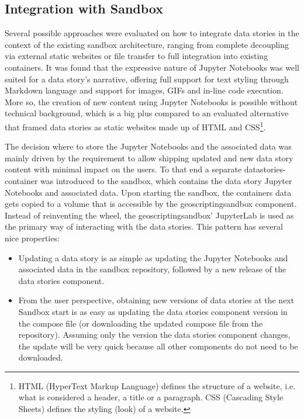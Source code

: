 \documentclass[11pt, a4paper, oneside, parskip=full-]{scrartcl}
\begin{document}
\subsection{Integration with Sandbox}
Several possible approaches were evaluated on how to integrate data stories in
the context of the existing sandbox architecture, ranging from complete
decoupling via external static websites or file transfer to full integration
into existing containers. It was found that the expressive nature of Jupyter
Notebooks was well suited for a data story's narrative, offering full support
for text styling through Markdown language and support for images, GIFs and
in-line code execution. More so, the creation of new content using Jupyter
Notebooks is possible without technical background, which is a big plus compared
to an evaluated alternative that framed data stories as static websites made up
of HTML and CSS\footnote{HTML (HyperText Markup Language) defines the structure
of a website, i.e. what is considered a header, a title or a paragraph. CSS
(Cascading Style Sheets) defines the styling (look) of a website.}.

The decision where to store the Jupyter Notebooks and the associated data was
mainly driven by the requirement to allow shipping updated and new data story
content with minimal impact on the users. To that end a separate
datastories-container was introduced to the sandbox, which contains the data
story Jupyter Notebooks and associated data. Upon starting the sandbox, the
containers data gets copied to a volume that is accessible by the
geoscriptingsandbox component. Instead of reinventing the wheel, the
geoscriptingsandbox' JupyterLab is used as the primary way of interacting with
the data stories. This pattern has several nice properties:
\begin{itemize}
  \item Updating a data story is as simple as updating the Jupyter Notebooks and
  associated data in the sandbox repository, followed by a new release of the
  data stories component.
  \item From the user perspective, obtaining new versions of data stories at the
  next Sandbox start is as easy as updating the data stories component version
  in the compose file (or downloading the updated compose file from the
  repository). Assuming only the version the data stories component changes, the
  update will be very quick because all other components do not need to be
  downloaded.
\end{itemize}
\end{document}
